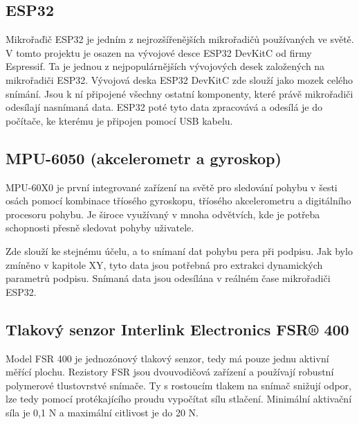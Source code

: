 \subsection*{ESP32}
Mikrořaďič ESP32 je jedním z nejrozšířenějších mikrořadičů používaných ve světě.                            %
V tomto projektu je osazen na vývojové desce ESP32 DevKitC od firmy Espressif.                              %
Ta je jednou z nejpopulárnějších vývojových desek založených na mikrořadiči ESP32.                          %
Vývojová deska ESP32 DevKitC zde slouží jako mozek celého snímání.                                          %
Jsou k ní připojené všechny ostatní komponenty, které právě mikrořadiči odesílají nasnímaná data.           %
ESP32 poté tyto data zpracovává a odesílá je do počítače, ke kterému je připojen  pomocí USB kabelu.        %

\subsection*{MPU-6050 (akcelerometr a gyroskop)}
MPU-60X0 je první integrované zařízení na světě pro sledování pohybu v šesti osách pomocí           %
kombinace tříosého gyroskopu, tříosého akcelerometru a digitálního procesoru pohybu.                %
Je široce využívaný v mnoha odvětvích, kde je potřeba schopnosti přesně sledovat pohyby uživatele.  %

Zde slouží ke stejnému účelu, a to snímaní dat pohybu pera při podpisu.                             %
Jak bylo zmíněno v kapitole XY, tyto data jsou potřebná pro extrakci dynamických parametrů podpisu. %
Snímaná data jsou odesílána v reálném čase mikrořadiči ESP32.                                       %

\subsection*{Tlakový senzor Interlink Electronics FSR® 400}
Model FSR 400 je jednozónový tlakový senzor, tedy má pouze jednu aktivní měřící plochu.                       %
Rezistory FSR jsou dvouvodičová zařízení a používají robustní polymerové tlustovrstvé snímače.                %
Ty s rostoucím tlakem na snímač snižují odpor, lze tedy pomocí protékajícího proudu vypočítat sílu stlačení.  %
Minimální aktivační síla je 0,1 N a maximální citlivost je do 20 N.                                           %


